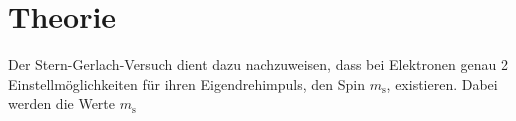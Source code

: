 \section{Theorie}
\label{sec:Theorie}
Der Stern-Gerlach-Versuch dient dazu nachzuweisen, dass bei Elektronen genau 2
Einstellmöglichkeiten für ihren Eigendrehimpuls, den Spin $ m_\text{s} $, existieren. 
Dabei werden die Werte $m_\text{s}$


\cite{sample}
